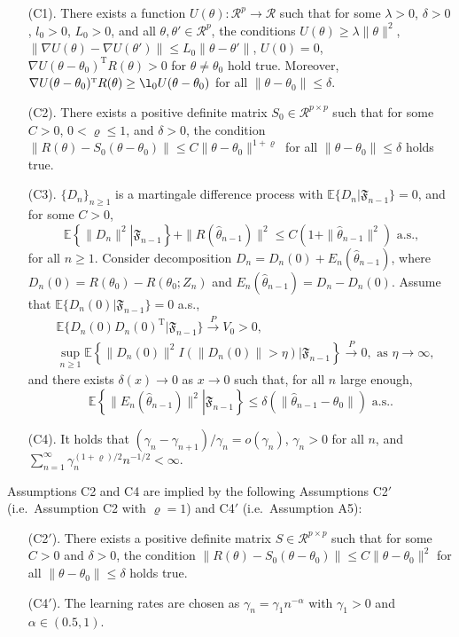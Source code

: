 \documentclass[twoside,11pt]{article}
\def\trans{^{ \mathrm{\scriptscriptstyle T} }}
\def\wh{\widehat}
\begin{document}
\begin{enumerate}
	\item[(C1).] There exists a function $U(\theta): \mathcal{R}^p \rightarrow \mathcal{R}$ such that for some $\lambda>0$, $\delta>0$, $l_0>0$, $L_0>0$, and all $\theta, \theta'\in \mathcal{R}^p$, the conditions $U(\theta)\geq \lambda\|\theta\|^2$, $\|\nabla U(\theta) - \nabla U(\theta')\|\leq L_0\|\theta-\theta'\|$, $U(0)=0$, $\nabla U(\theta-\theta_0)\trans R(\theta)>0$ for $\theta\neq \theta_0$ hold true. Moreover, $\nabla U(\theta-\theta_0)\trans R(\theta)\geq \l_0 U(\theta-\theta_0)$ for all $\|\theta-\theta_0\|\leq \delta$.

	\item[(C2).] There exists a positive definite matrix $S_0\in \mathcal{R}^{p\times p}$ such that for some $C>0$, $0<\varrho\leq 1$, and $\delta>0$, the condition $\|R(\theta)-S_0(\theta-\theta_0)\| \leq C\|\theta-\theta_0\|^{1+\varrho}$ for all $\|\theta-\theta_0\|\leq \delta$ holds true.

	\item[(C3).] $\{D_n\}_{n\geq 1}$ is a martingale difference process with $\mathbb{E}\{D_n|\mathfrak{F}_{n-1}\}=0$, and for some $C>0$,
	$$\mathbb{E}\left\{\|D_n\|^2\left.\right|\mathfrak{F}_{n-1}\right\}+\|R(\wh{\theta}_{n-1})\|^2\leq C\left(1+\|\wh{\theta}_{n-1}\|^2\right)\mbox{\ a.s.,} $$
	for all $n\geq 1$. Consider decomposition $D_n=D_n(0)+E_n(\wh{\theta}_{n-1})$, where $D_n(0)=R(\theta_0)-\wh{R}(\theta_0; Z_n)$ and $E_n(\wh{\theta}_{n-1})=D_n-D_n(0)$. Assume that $\mathbb{E}\{D_n(0)|\mathfrak{F}_{n-1}\}=0$ a.s.,
	\begin{eqnarray*}
		&\mathbb{E}\{D_n(0)D_n(0)\trans|\mathfrak{F}_{n-1}\}\stackrel{P}{\rightarrow} V_0>0, \\
		&\sup_{n\geq 1}\mathbb{E}\left\{\|D_n(0)\|^2I(\|D_n(0)\|>\eta)|\mathfrak{F}_{n-1}\right\}\stackrel{P}{\rightarrow} 0, \mbox{\ as\ }\eta\rightarrow\infty,
	\end{eqnarray*}
	and there exists $\delta(x)\rightarrow 0$ as $x\rightarrow 0$ such that, for all $n$ large enough,
	$$\mathbb{E}\left\{\|E_n(\wh{\theta}_{n-1})\|^2\left.\right|\mathfrak{F}_{n-1}\right\}\leq \delta(\|\wh{\theta}_{n-1}-\theta_0\|) \mbox{\ \  a.s..}$$
	\item[(C4).] It holds that $(\gamma_n-\gamma_{n+1})/\gamma_n=o(\gamma_n)$, $\gamma_n>0$ for all $n$, and
	$\sum_{n=1}^{\infty}\gamma_n^{(1+\varrho)/2}n^{-1/2}<\infty.$
\end{enumerate}

Assumptions C2 and C4 are implied by the following Assumptions C2$'$ (i.e.~Assumption C2 with $\varrho=1$) and C4$'$ (i.e.~Assumption A5):
\begin{enumerate}
	\item[(C2$'$).] There exists a positive definite matrix $S\in \mathcal{R}^{p\times p}$ such that for some $C>0$ and $\delta>0$, the condition $\|R(\theta)-S_0(\theta-\theta_0)\| \leq C\|\theta-\theta_0\|^2$ for all $\|\theta-\theta_0\|\leq \delta$ holds true.
	\item[(C4$'$).] The learning rates are chosen as $\gamma_n=\gamma_1 n^{-\alpha}$ with $\gamma_1>0$ and $\alpha\in(0.5, 1)$.
\end{enumerate}
\end{document}
